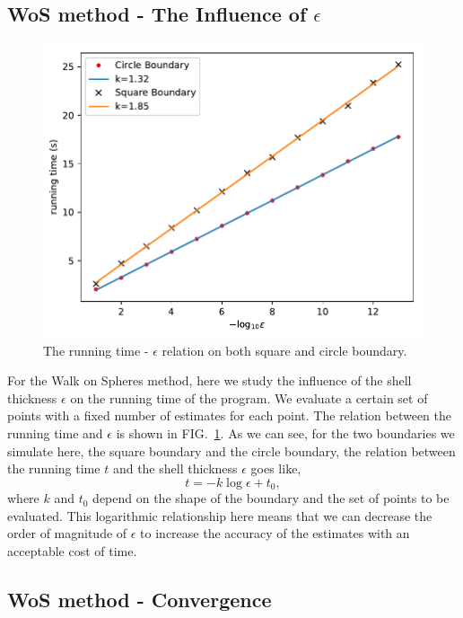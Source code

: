 \documentclass[aps, prl, preprint, groupedaddress]{revtex4-1}
\begin{document}
\subsection{WoS method - The Influence of $\epsilon$}

\begin{figure}[htbp]
    \centering
    \includegraphics[width=.8\textwidth]{./figs/ep_t}
    \caption{\label{fig:ep_t} The running time - $\epsilon$ relation on both square and circle boundary.}
\end{figure}

For the Walk on Spheres method, here we study the influence of the shell thickness $\epsilon$ on the running time of the program. We evaluate a certain set of points with a fixed number of estimates for each point. The relation between the running time and $\epsilon$ is shown in FIG.~\ref{fig:ep_t}. As we can see, for the two boundaries we simulate here, the square boundary and the circle boundary, the relation between the running time $t$ and the shell thickness $\epsilon$ goes like,
\begin{equation}
    t = -k\log\epsilon + t_0,
\end{equation}
where $k$ and $t_0$ depend on the shape of the boundary and the set of points to be evaluated. This logarithmic relationship here means that we can decrease the order of magnitude of $\epsilon$ to increase the accuracy of the estimates with an acceptable cost of time.

\subsection{WoS method - Convergence}
\end{document}
